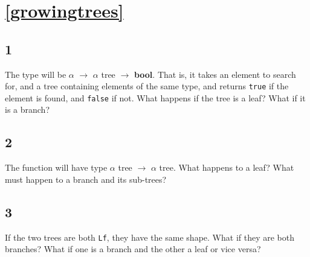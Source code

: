 \documentclass[]{book}
\newcommand{\smspace}{\vspace{4mm}}
\begin{document}





\section*{\ref{growingtrees}\\ }

\subsection*{1}
The type will be \textrm{$\alpha$ $\rightarrow$ $\alpha$ tree $\rightarrow$ \textbf{bool}}. That is, it takes an element to search for, and a tree containing elements of the same type, and returns \texttt{true} if the element is found, and \texttt{false} if not. What happens if the tree is a leaf? What if it is a branch?

\subsection*{2}
The function will have type \textrm{$\alpha$  tree $\rightarrow$ $\alpha$ tree}. What happens to a leaf? What must happen to a branch and its sub-trees?

\subsection*{3}
If the two trees are both \texttt{Lf}, they have the same shape. What if they
are both branches? What if one is a branch and the other a leaf or vice versa? %
\end{document}
